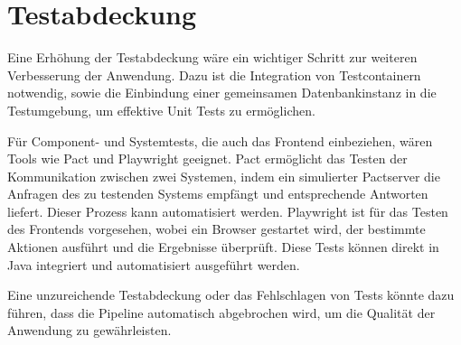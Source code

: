 \section{Testabdeckung}
Eine Erhöhung der Testabdeckung wäre ein wichtiger Schritt zur weiteren Verbesserung der Anwendung. Dazu ist die Integration von Testcontainern notwendig, sowie die Einbindung einer 
gemeinsamen Datenbankinstanz in die Testumgebung, um effektive Unit Tests zu ermöglichen.

Für Component- und Systemtests, die auch das Frontend einbeziehen, wären Tools wie Pact und Playwright geeignet. Pact ermöglicht das Testen der Kommunikation zwischen zwei Systemen, 
indem ein simulierter Pactserver die Anfragen des zu testenden Systems empfängt und entsprechende Antworten liefert. Dieser Prozess kann automatisiert werden. Playwright ist für das Testen des Frontends vorgesehen, wobei ein Browser gestartet wird, der bestimmte Aktionen ausführt und die Ergebnisse überprüft. Diese Tests können direkt in Java integriert und automatisiert ausgeführt werden.

Eine unzureichende Testabdeckung oder das Fehlschlagen von Tests könnte dazu führen, dass die Pipeline automatisch abgebrochen wird, um die Qualität der Anwendung zu gewährleisten.